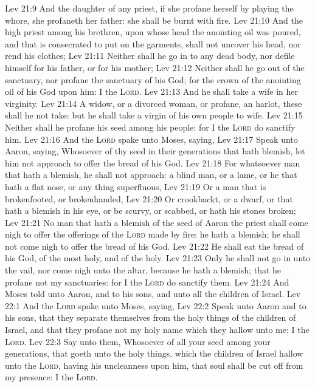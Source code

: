 \vs Lev 21:9 And the daughter of any priest, if she profane herself by playing the whore, she profaneth her father: she shall be burnt with fire.
\vs Lev 21:10 And  the high priest among his brethren, upon whose head the anointing oil was poured, and that is consecrated to put on the garments, shall not uncover his head, nor rend his clothes;
\vs Lev 21:11 Neither shall he go in to any dead body, nor defile himself for his father, or for his mother;
\vs Lev 21:12 Neither shall he go out of the sanctuary, nor profane the sanctuary of his God; for the crown of the anointing oil of his God  upon him: I  the \textsc{Lord}.
\vs Lev 21:13 And he shall take a wife in her virginity.
\vs Lev 21:14 A widow, or a divorced woman, or profane,  an harlot, these shall he not take: but he shall take a virgin of his own people to wife.
\vs Lev 21:15 Neither shall he profane his seed among his people: for I the \textsc{Lord} do sanctify him.
\vs Lev 21:16 And the \textsc{Lord} spake unto Moses, saying,
\vs Lev 21:17 Speak unto Aaron, saying, Whosoever  of thy seed in their generations that hath  blemish, let him not approach to offer the bread of his God.
\vs Lev 21:18 For whatsoever man  that hath a blemish, he shall not approach: a blind man, or a lame, or he that hath a flat nose, or any thing superfluous,
\vs Lev 21:19 Or a man that is brokenfooted, or brokenhanded,
\vs Lev 21:20 Or crookbackt, or a dwarf, or that hath a blemish in his eye, or be scurvy, or scabbed, or hath his stones broken;
\vs Lev 21:21 No man that hath a blemish of the seed of Aaron the priest shall come nigh to offer the offerings of the \textsc{Lord} made by fire: he hath a blemish; he shall not come nigh to offer the bread of his God.
\vs Lev 21:22 He shall eat the bread of his God,  of the most holy, and of the holy.
\vs Lev 21:23 Only he shall not go in unto the vail, nor come nigh unto the altar, because he hath a blemish; that he profane not my sanctuaries: for I the \textsc{Lord} do sanctify them.
\vs Lev 21:24 And Moses told  unto Aaron, and to his sons, and unto all the children of Israel.
\vs Lev 22:1 And the \textsc{Lord} spake unto Moses, saying,
\vs Lev 22:2 Speak unto Aaron and to his sons, that they separate themselves from the holy things of the children of Israel, and that they profane not my holy name  which they hallow unto me: I  the \textsc{Lord}.
\vs Lev 22:3 Say unto them, Whosoever  of all your seed among your generations, that goeth unto the holy things, which the children of Israel hallow unto the \textsc{Lord}, having his uncleanness upon him, that soul shall be cut off from my presence: I  the \textsc{Lord}.
